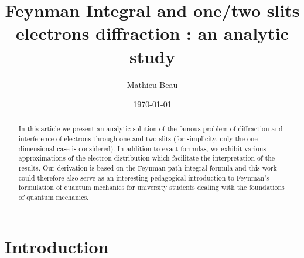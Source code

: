 \documentclass[12pt,aps,prb,preprint]{revtex4-1}   %
\begin{document}
\title{Feynman Integral and one/two slits electrons diffraction : an analytic study}
\author{Mathieu Beau}
\date{\today}




\begin{abstract}

In this article we present an analytic solution of the famous
problem of diffraction and interference of electrons through one
and two slits (for simplicity, only the one-dimensional case is
considered). 
In addition to exact formulas, 
we exhibit various approximations of the electron
distribution which facilitate the interpretation of the results.
Our derivation is based on the Feynman path integral formula and
this work could therefore also serve as an interesting pedagogical
introduction to Feynman's  formulation of quantum mechanics for
university students dealing with the foundations of quantum
mechanics.
\end{abstract}


\maketitle

\section{Introduction}
\end{document}
